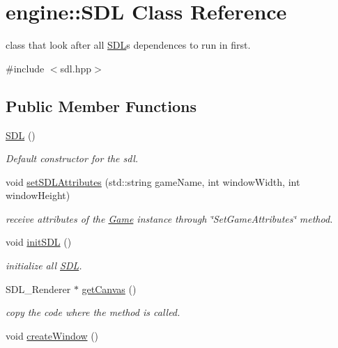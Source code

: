 \hypertarget{classengine_1_1_s_d_l}{}\section{engine\+:\+:S\+DL Class Reference}
\label{classengine_1_1_s_d_l}


class that look after all \hyperlink{classengine_1_1_s_d_l}{S\+DL}\textquotesingle{}s dependences to run in first.  




{\ttfamily \#include $<$sdl.\+hpp$>$}

\subsection*{Public Member Functions}
\begin{DoxyCompactItemize}
\item 
\hyperlink{classengine_1_1_s_d_l_af3795554364a7fce185958eede6ad061}{S\+DL} ()
\begin{DoxyCompactList}\small\item\em Default constructor for the sdl. \end{DoxyCompactList}\item 
void \hyperlink{classengine_1_1_s_d_l_af6ee7dd9c220e82ce4f931a0325b315f}{set\+S\+D\+L\+Attributes} (std\+::string game\+Name, int window\+Width, int window\+Height)
\begin{DoxyCompactList}\small\item\em receive attributes of the \hyperlink{classengine_1_1_game}{Game} instance through \char`\"{}\+Set\+Game\+Attributes\char`\"{} method. \end{DoxyCompactList}\item 
void \hyperlink{classengine_1_1_s_d_l_a10afdc6fa827ad9c3772c7ef759a903c}{init\+S\+DL} ()
\begin{DoxyCompactList}\small\item\em initialize all \hyperlink{classengine_1_1_s_d_l}{S\+DL}. \end{DoxyCompactList}\item 
S\+D\+L\+\_\+\+Renderer $\ast$ \hyperlink{classengine_1_1_s_d_l_a3875fe564e0571ef84c899ead42675c6}{get\+Canvas} ()
\begin{DoxyCompactList}\small\item\em copy the code where the method is called. \end{DoxyCompactList}\item 
void \hyperlink{classengine_1_1_s_d_l_a3259aab79da90549924b0eb286e61e64}{create\+Window} ()

\end{DoxyCompactItemize}
